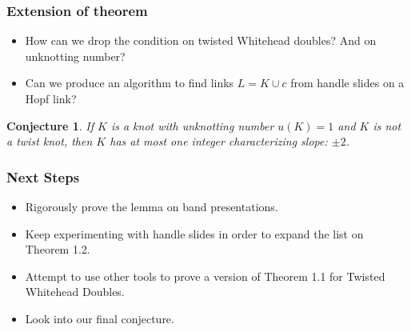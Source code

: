 \documentclass{beamer}
\newtheorem{conjecture}[theorem]{Conjecture}
\theoremstyle{ex}
\theoremstyle{rem}
\begin{document}
\begin{frame}
	\frametitle{Extension of theorem}
	\begin{itemize}
		\item How can we drop the condition on twisted Whitehead doubles? And on unknotting number?
		\item Can we produce an algorithm to find links $L = K \cup c$ from handle slides on a Hopf link?
	\end{itemize}
	\begin{conjecture}
		If $K$ is a knot with unknotting number $u(K) = 1$ and $K$ is not a twist knot, then $K$ has at most \textit{one} integer characterizing slope: $\pm 2$.
	\end{conjecture}
\end{frame}

\begin{frame}
	\frametitle{Next Steps}
	\begin{itemize}
		\item Rigorously prove the lemma on band presentations.
		\item Keep experimenting with handle slides in order to expand the list on Theorem 1.2.
		\item Attempt to use other tools to prove a version of Theorem 1.1 for Twisted Whitehead Doubles.
		\item Look into our final conjecture.
	\end{itemize}
\end{frame}
\end{document}
